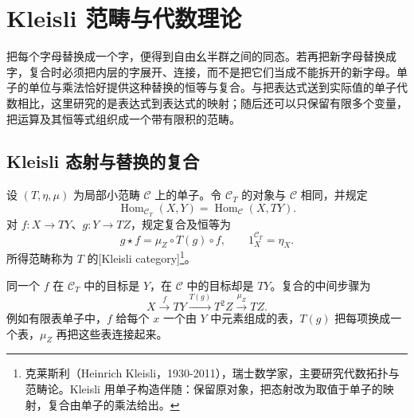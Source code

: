 
\section{Kleisli 范畴与代数理论}
\label{b4:sec:A05}

把每个字母替换成一个字，便得到自由幺半群之间的同态。若再把新字母替换成字，复合时必须把内层的字展开、连接，而不是把它们当成不能拆开的新字母。单子的单位与乘法恰好提供这种替换的恒等与复合。与把表达式送到实际值的单子代数相比，这里研究的是表达式到表达式的映射；随后还可以只保留有限多个变量，把运算及其恒等式组织成一个带有限积的范畴。

\subsection{Kleisli 态射与替换的复合}
\label{b4:subsec:A05:01}

\begin{definition}\label{b4:def:A-kleisli-category}
	设 \((T,\eta,\mu)\) 为局部小范畴 \(\mathcal C\) 上的单子。令 \(\mathcal C_T\) 的对象与 \(\mathcal C\) 相同，并规定
	\[
		\operatorname{Hom}_{\mathcal C_T}(X,Y) =\operatorname{Hom}_{\mathcal C}(X,TY).
	\]
	对 \(f:X\to TY\)、\(g:Y\to TZ\)，规定复合及恒等为
	\[
		g\star f=\mu_Z\circ T(g)\circ f, \qquad 1_X^{\mathcal C_T}=\eta_X.
	\]
	所得范畴称为 \(T\) 的[Kleisli category]\footnote{克莱斯利（Heinrich Kleisli，1930-2011），瑞士数学家，主要研究代数拓扑与范畴论。Kleisli 用单子构造伴随：保留原对象，把态射改为取值于单子的映射，复合由单子的乘法给出。}。
\end{definition}

同一个 \(f\) 在 \(\mathcal C_T\) 中的目标是 \(Y\)，在 \(\mathcal C\) 中的目标却是 \(TY\)。复合的中间步骤为
\[
	X\xrightarrow{f}TY\xrightarrow{T(g)}T^2Z \xrightarrow{\mu_Z}TZ.
\]
例如有限表单子中，\(f\) 给每个 \(x\) 一个由 \(Y\) 中元素组成的表，\(T(g)\) 把每项换成一个表，\(\mu_Z\) 再把这些表连接起来。

